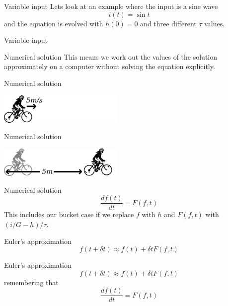 \documentclass{beamer}
\newcommand{\crish}{\color{reddish}}
\newcommand{\cbla}{\color{black}}
\newcommand{\cblu}{\color{blue}}
\begin{document}
\begin{frame}{Variable input}
  Lets look at an example where the input is a sine wave\cblu
  $$i(t)=\sin{t}$$
  \cbla{}and the equation is evolved with \crish$h(0)=0$\cbla{} and three different \crish$\tau$\cbla{}  values.
\end{frame}
  
\begin{frame}{Variable input}
  \vskip -0.7cm
  
\end{frame}

\begin{frame}{Numerical solution}
This means we work out the values of the solution approximately on a computer without solving the equation explicitly.
  \end{frame}



\begin{frame}{Numerical solution}
  \begin{center}
    \includegraphics[width=6cm]{cyclist1.png}
  \end{center}
  \end{frame}


\begin{frame}{Numerical solution}
  \begin{center}
    \includegraphics[width=6cm]{cyclist2.png}
  \end{center}
  \end{frame}

\begin{frame}{Numerical solution}
\crish
  $$
\frac{df(t)}{dt}=F(f,t)
$$
\cbla{}This includes our bucket case if we replace \crish$f$\cbla{} with \crish$h$\cbla{} and \crish$F(f,t)$\cbla{}
with \crish$(i/G-h)/\tau$\cbla.
\end{frame}

\begin{frame}{Euler's approximation}
  \crish
  $$
  f(t+\delta t)\approx f(t)+\delta t F(f,t)
  $$
\cbla
\end{frame}


\begin{frame}{Euler's approximation}
  \crish
  $$
  f(t+\delta t)\approx f(t)+\delta t F(f,t)
  $$
  \cbla remembering that
  \crish
  $$\frac{df(t)}{dt}=F(f,t)$$
  \cbla{}
\end{frame}
\end{document}
